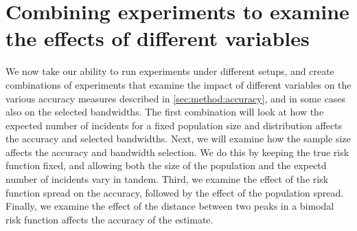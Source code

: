 \section[Combining experiments]{Combining experiments to examine the effects of different variables}
\label{sec:method:combining_experiments}

We now take our ability to run experiments under different setups,
and create combinations of experiments that examine the impact of different variables on the various accuracy measures described in \cref{sec:method:accuracy},
and in some cases also on the selected bandwidths.
The first combination will look at how the expected number of incidents for a fixed population size and distribution affects the accuracy and selected bandwidths.
Next, we will examine how the sample size affects the accuracy and bandwidth selection.
We do this by keeping the true risk function fixed, and allowing both the size of the population and the expectd number of incidents vary in tandem.
Third, we examine the effect of the risk function spread on the accuracy, followed by the effect of the population spread.
Finally, we examine the effect of the distance between two peaks in a bimodal risk function affects the accuracy of the estimate.

